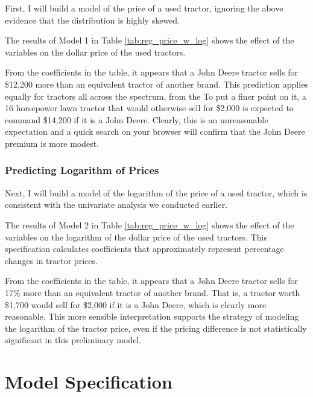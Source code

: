 \documentclass[11pt]{paper}
\begin{document}
First, I will build a model of the price of a used tractor, 
ignoring the above evidence that the distribution is highly skewed. 



The results of Model 1 in Table \ref{tab:reg_price_w_log}
shows the effect of the variables on the dollar price of the
used tractors. 

From the coefficients in the table, 
it appears that a John Deere tractor sells for 
\$12,200 more than an equivalent tractor of another brand. 
This prediction applies equally for tractors all across the spectrum, from the 
To put a finer point on it, 
a 16 horsepower lawn tractor that would otherwise sell for \$2,000 is expected to command \$14,200 if it is a John Deere.
Clearly, this is an unreasonable expectation and
a quick search on your browser will confirm that the John Deere premium is more modest. 


\subsubsection{Predicting Logarithm of Prices}

Next, I will build a model of the logarithm of the price 
of a used tractor, 
which is consistent with the univariate analysis we conducted earlier. 

% 

The results of Model 2 in Table \ref{tab:reg_price_w_log}
shows the effect of the variables on the logarithm of the dollar price of the used tractors. 
This specification calculates coefficients that 
approximately represent percentage changes in 
tractor prices. 

From the coefficients in the table, 
it appears that a John Deere tractor sells for 
17\% more than an equivalent tractor of another brand. 
That is, a tractor worth \$1,700 would sell
for \$2,000 if it is a John Deere, 
which is clearly more reasonable. 
This more sensible interpretation supports 
the strategy of modeling the 
logarithm of the tractor price, 
even if the pricing difference is not statistically significant 
in this preliminary model. 


\clearpage
\section{Model Specification}
\end{document}
